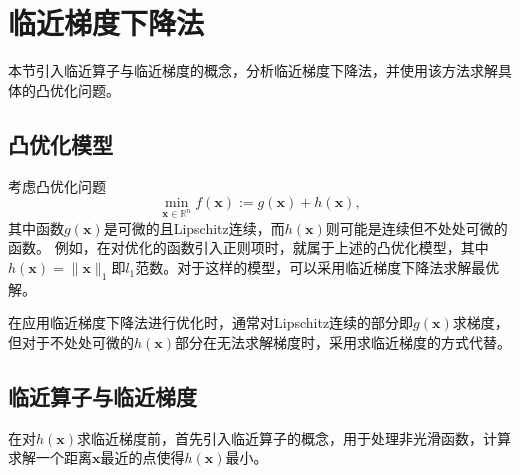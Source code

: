 \section{临近梯度下降法}

本节引入临近算子与临近梯度的概念，分析临近梯度下降法，并使用该方法求解具体的凸优化问题。

\subsection{凸优化模型}

考虑凸优化问题
\begin{equation}
    \min\limits_{\bm{x}\in \mathbb{R}^{n}} f(\bm{x}) := g(\bm{x}) + h(\bm{x}),
    \label{eq_prox_1}
\end{equation}
其中函数$g(\bm{x})$是可微的且Lipschitz连续，而$h(\bm{x})$则可能是连续但不处处可微的函数。
例如，在对优化的函数引入正则项时，就属于上述的凸优化模型，其中$h(\bm{x})=\|\bm{x}\|_{1}$即$l_{1}$范数。对于这样的模型，可以采用临近梯度下降法求解最优解。

在应用临近梯度下降法进行优化时，通常对Lipschitz连续的部分即$g(\bm{x})$求梯度，但对于不处处可微的$h(\bm{x})$部分在无法求解梯度时，采用求临近梯度的方式代替。

\subsection{临近算子与临近梯度}

在对$h(\bm{x})$求临近梯度\cite{2014Prox}前，首先引入临近算子的概念，用于处理非光滑函数，计算求解一个距离$\bm{x}$最近的点使得$h(\bm{x})$最小。


